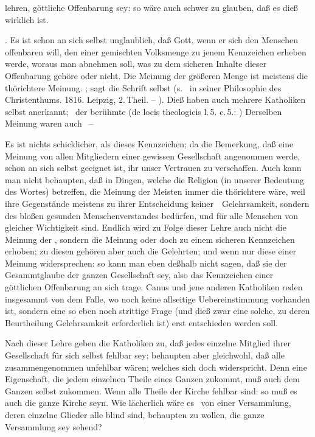 lehren, göttliche Offenbarung sey: so wäre auch schwer zu glauben, daß es dieß wirklich ist.\par
{}. Es ist schon an sich selbst unglaublich, daß Gott, wenn er sich den Menschen offenbaren will, den  einer gemischten Volksmenge zu jenem Kennzeichen erheben werde, woraus man abnehmen soll, was zu dem sicheren Inhalte dieser Offenbarung gehöre oder nicht. Die Meinung der größeren Menge ist meistens die thörichtere Meinung. ; sagt die Schrift selbst (s.~ in seiner Philosophie des Christenthums. 1816. Leipzig, 2.\,Theil. -- \uA ). Dieß haben auch mehrere Katholiken selbst anerkannt; \zB\ der berühmte  (de locis theologicis l.\,5. c.\,5.: ) Derselben Meinung waren auch  \uA\  --\par
{} Es ist nichts schicklicher, als dieses Kennzeichen; da die Bemerkung, daß eine Meinung von allen Mitgliedern einer gewissen Gesellschaft angenommen werde, schon an sich selbst geeignet ist, ihr unser Vertrauen zu verschaffen. Auch kann man nicht behaupten, daß in Dingen, welche die Religion (in unserer Bedeutung des Wortes) betreffen, die Meinung der Meisten immer die thörichtere wäre, weil ihre Gegenstände meistens zu ihrer Entscheidung keiner~\ Gelehrsamkeit, sondern des bloßen gesunden Menschenverstandes bedürfen, und für alle Menschen von gleicher Wichtigkeit sind. Endlich wird zu Folge dieser Lehre auch nicht die Meinung der , sondern die Meinung  oder doch  zu einem sicheren Kennzeichen erhoben; zu diesen gehören aber auch die Gelehrten; und wenn nur diese einer Meinung widersprechen: so kann man eben deßhalb nicht sagen, daß sie der Gesammtglaube der ganzen Gesellschaft sey, also das Kennzeichen einer göttlichen Offenbarung an sich trage. Canus und jene anderen Katholiken reden insgesammt von dem Falle, wo noch keine allseitige Uebereinstimmung vorhanden ist, sondern eine so eben noch strittige Frage (und dieß zwar eine solche, zu deren Beurtheilung Gelehrsamkeit erforderlich ist) erst entschieden werden soll.\par
{} Nach dieser Lehre geben die Katholiken zu, daß jedes einzelne Mitglied ihrer Gesellschaft für sich selbst fehlbar sey; behaupten aber gleichwohl, daß alle zusammengenommen unfehlbar wären; welches sich doch widerspricht. Denn eine Eigenschaft, die jedem einzelnen Theile eines Ganzen zukommt, muß auch dem Ganzen selbst zukommen. Wenn alle Theile der Kirche fehlbar sind: so muß es auch die ganze Kirche seyn. Wie lächerlich wäre es \zB\ von einer Versammlung, deren einzelne Glieder alle blind sind, behaupten zu wollen, die ganze Versammlung sey sehend?\par

